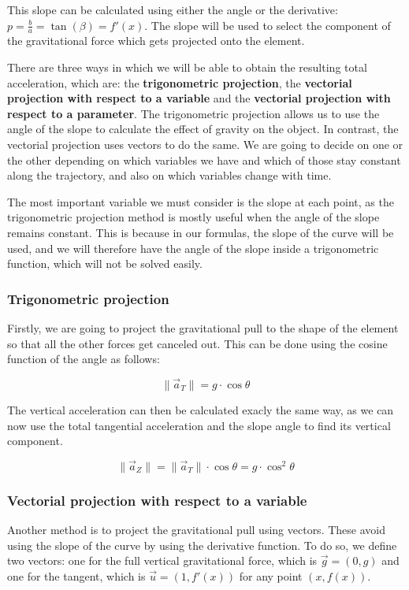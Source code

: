 \documentclass[12pt,twoside,a4paper]{article}
\begin{document}
	This slope can be calculated using either the angle or the derivative: $p = \frac{b}{a} = \tan(\beta) = f'(x)$. The slope will be used to select the component of the gravitational force which gets projected onto the element.

	There are three ways in which we will be able to obtain the resulting total acceleration, which are: the \textbf{trigonometric projection}, the \textbf{vectorial projection with respect to a variable} and the \textbf{vectorial projection with respect to a parameter}. The trigonometric projection allows us to use the angle of the slope to calculate the effect of gravity on the object. In contrast, the vectorial projection uses vectors to do the same. We are going to decide on one or the other depending on which variables we have and which of those stay constant along the trajectory, and also on which variables change with time.
	
	The most important variable we must consider is the slope at each point, as the trigonometric projection method is mostly useful when the angle of the slope remains constant. This is because in our formulas, the slope of the curve will be used, and we will therefore have the angle of the slope inside a trigonometric function, which will not be solved easily.

	\subsubsection*{Trigonometric projection}
	Firstly, we are going to project the gravitational pull to the shape of the element so that all the other forces get canceled out. This can be done using the cosine function of the angle as follows:
	
	$$\|\vec{a}_T\| = g \cdot \cos{\theta}$$
	
	The vertical acceleration can then be calculated exacly the same way, as we can now use the total tangential acceleration and the slope angle to find its vertical component.
	
	$$\|\vec{a}_Z\| = \|\vec{a}_T\| \cdot \cos{\theta} = g \cdot \cos^2{\theta}$$

	\subsubsection*{Vectorial projection with respect to a variable}
	
	Another method is to project the gravitational pull using vectors. These avoid using the slope of the curve by using the derivative function. To do so, we define two vectors: one for the full vertical gravitational force, which is $\vec{g} = (0, g)$ and one for the tangent, which is $\vec{u} = (1, f'(x))$ for any point $(x, f(x))$.
	
\end{document}
